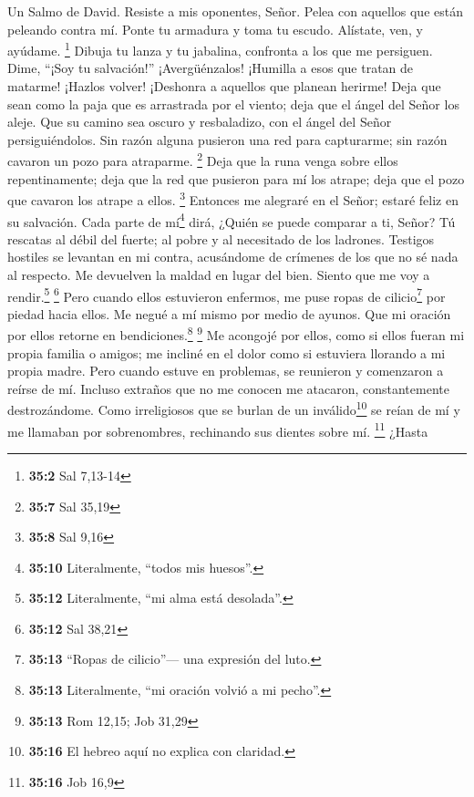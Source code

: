 Un Salmo de David.  Resiste a mis oponentes, Señor. Pelea
con aquellos que están peleando contra mí.  Ponte tu
armadura y toma tu escudo. Alístate, ven, y ayúdame. \footnote{\textbf{35:2}
  Sal 7,13-14}  Dibuja tu lanza y tu jabalina, confronta a
los que me persiguen. Dime, ``¡Soy tu salvación!'' 
¡Avergüénzalos! ¡Humilla a esos que tratan de matarme! ¡Hazlos volver!
¡Deshonra a aquellos que planean herirme!  Deja que sean
como la paja que es arrastrada por el viento; deja que el ángel del
Señor los aleje.  Que su camino sea oscuro y resbaladizo,
con el ángel del Señor persiguiéndolos.  Sin razón alguna
pusieron una red para capturarme; sin razón cavaron un pozo para
atraparme. \footnote{\textbf{35:7} Sal 35,19}  Deja que la
runa venga sobre ellos repentinamente; deja que la red que pusieron para
mí los atrape; deja que el pozo que cavaron los atrape a ellos.
\footnote{\textbf{35:8} Sal 9,16}  Entonces me alegraré en
el Señor; estaré feliz en su salvación.  Cada parte de
mí\footnote{\textbf{35:10} Literalmente, ``todos mis huesos''.} dirá,
¿Quién se puede comparar a ti, Señor? Tú rescatas al débil del fuerte;
al pobre y al necesitado de los ladrones.  Testigos
hostiles se levantan en mi contra, acusándome de crímenes de los que no
sé nada al respecto.  Me devuelven la maldad en lugar del
bien. Siento que me voy a rendir.\footnote{\textbf{35:12} Literalmente,
  ``mi alma está desolada''.} \footnote{\textbf{35:12} Sal 38,21}
 Pero cuando ellos estuvieron enfermos, me puse ropas de
cilicio\footnote{\textbf{35:13} ``Ropas de cilicio''--- una expresión
  del luto.} por piedad hacia ellos. Me negué a mí mismo por medio de
ayunos. Que mi oración por ellos retorne en bendiciones.\footnote{\textbf{35:13}
  Literalmente, ``mi oración volvió a mi pecho''.} \footnote{\textbf{35:13}
  Rom 12,15; Job 31,29}  Me acongojé por ellos, como si
ellos fueran mi propia familia o amigos; me incliné en el dolor como si
estuviera llorando a mi propia madre.  Pero cuando estuve
en problemas, se reunieron y comenzaron a reírse de mí. Incluso extraños
que no me conocen me atacaron, constantemente destrozándome.
 Como irreligiosos que se burlan de un
inválido\footnote{\textbf{35:16} El hebreo aquí no explica con claridad.}
se reían de mí y me llamaban por sobrenombres, rechinando sus dientes
sobre mí. \footnote{\textbf{35:16} Job 16,9}  ¿Hasta
